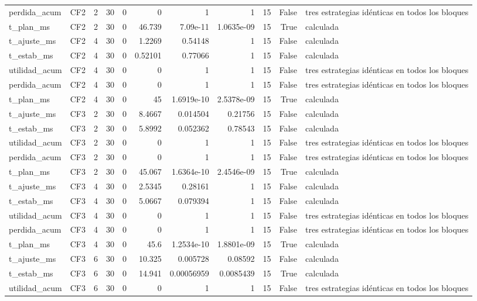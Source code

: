 \begin{tabular}{llrrrrrrrrl}
perdida_acum & CF2 & 2 & 30 & 0 & 0 & 1 & 1 & 15 & False & tres estrategias idénticas en todos los bloques \\
t_plan_ms & CF2 & 2 & 30 & 0 & 46.739 & 7.09e-11 & 1.0635e-09 & 15 & True & calculada \\
t_ajuste_ms & CF2 & 4 & 30 & 0 & 1.2269 & 0.54148 & 1 & 15 & False & calculada \\
t_estab_ms & CF2 & 4 & 30 & 0 & 0.52101 & 0.77066 & 1 & 15 & False & calculada \\
utilidad_acum & CF2 & 4 & 30 & 0 & 0 & 1 & 1 & 15 & False & tres estrategias idénticas en todos los bloques \\
perdida_acum & CF2 & 4 & 30 & 0 & 0 & 1 & 1 & 15 & False & tres estrategias idénticas en todos los bloques \\
t_plan_ms & CF2 & 4 & 30 & 0 & 45 & 1.6919e-10 & 2.5378e-09 & 15 & True & calculada \\
t_ajuste_ms & CF3 & 2 & 30 & 0 & 8.4667 & 0.014504 & 0.21756 & 15 & False & calculada \\
t_estab_ms & CF3 & 2 & 30 & 0 & 5.8992 & 0.052362 & 0.78543 & 15 & False & calculada \\
utilidad_acum & CF3 & 2 & 30 & 0 & 0 & 1 & 1 & 15 & False & tres estrategias idénticas en todos los bloques \\
perdida_acum & CF3 & 2 & 30 & 0 & 0 & 1 & 1 & 15 & False & tres estrategias idénticas en todos los bloques \\
t_plan_ms & CF3 & 2 & 30 & 0 & 45.067 & 1.6364e-10 & 2.4546e-09 & 15 & True & calculada \\
t_ajuste_ms & CF3 & 4 & 30 & 0 & 2.5345 & 0.28161 & 1 & 15 & False & calculada \\
t_estab_ms & CF3 & 4 & 30 & 0 & 5.0667 & 0.079394 & 1 & 15 & False & calculada \\
utilidad_acum & CF3 & 4 & 30 & 0 & 0 & 1 & 1 & 15 & False & tres estrategias idénticas en todos los bloques \\
perdida_acum & CF3 & 4 & 30 & 0 & 0 & 1 & 1 & 15 & False & tres estrategias idénticas en todos los bloques \\
t_plan_ms & CF3 & 4 & 30 & 0 & 45.6 & 1.2534e-10 & 1.8801e-09 & 15 & True & calculada \\
t_ajuste_ms & CF3 & 6 & 30 & 0 & 10.325 & 0.005728 & 0.08592 & 15 & False & calculada \\
t_estab_ms & CF3 & 6 & 30 & 0 & 14.941 & 0.00056959 & 0.0085439 & 15 & True & calculada \\
utilidad_acum & CF3 & 6 & 30 & 0 & 0 & 1 & 1 & 15 & False & tres estrategias idénticas en todos los bloques \\

\end{tabular}
